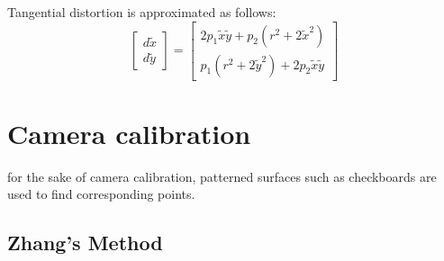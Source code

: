 \documentclass{article}
\begin{document}
Tangential distortion is approximated as follows:
\[
    \begin{bmatrix}
        d\tilde{x}\\ d\tilde{y} 
    \end{bmatrix} = \begin{bmatrix}
        2p_1\tilde{x}\tilde{y}+p_2(r^2+2\tilde{x}^2)\\
        p_1(r^2+2\tilde{y}^2)+2p_2\tilde{x}\tilde{y}
    \end{bmatrix}
\]
\section{Camera calibration}
for the sake of camera calibration, patterned surfaces such as checkboards are used to find corresponding points.
\subsection{Zhang's Method}
\end{document}
